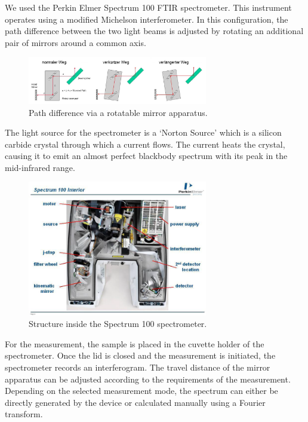 \documentclass{article}
\begin{document}
We used the Perkin Elmer Spectrum 100 FTIR spectrometer. This instrument operates using a modified Michelson interferometer. In this configuration, the path difference between the two light beams is adjusted by rotating an additional pair of mirrors around a common axis.

\begin{figure}[h]
    \centering
    \includegraphics[width=0.7\textwidth]{Figures/Introduction/Pathdifference.png}
    \caption{Path difference via a rotatable mirror apparatus. \cite{riede_rotationvibration}}
    \label{fig:path_difference}
\end{figure}

The light source for the spectrometer is a `Norton Source' which is a silicon carbide crystal through which a current flows. The current heats the crystal, causing it to emit an almost perfect blackbody spectrum with its peak in the mid-infrared range.

\begin{figure}[h]
    \centering
    \includegraphics[width=0.7\textwidth]{Figures/Introduction/Spectrum100Interior.png}
    \caption{Structure inside the Spectrum 100 spectrometer. \cite{riede_rotationvibration}}
    \label{fig:spectrum_100_structure}
\end{figure}

For the measurement, the sample is placed in the cuvette holder of the spectrometer. Once the lid is closed and the measurement is initiated, the spectrometer records an interferogram. The travel distance of the mirror apparatus can be adjusted according to the requirements of the measurement. Depending on the selected measurement mode, the spectrum can either be directly generated by the device or calculated manually using a Fourier transform. 
\end{document}
